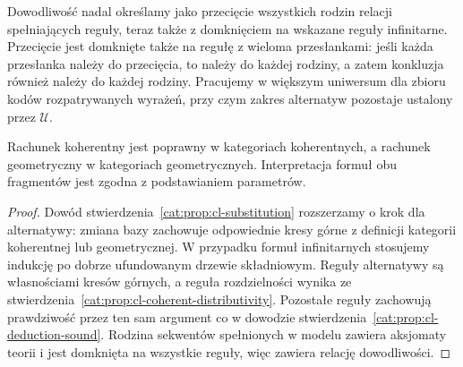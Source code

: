 Dowodliwość nadal określamy jako przecięcie wszystkich rodzin relacji spełniających reguły, teraz także z domknięciem na wskazane reguły infinitarne. Przecięcie jest domknięte także na regułę z wieloma przesłankami: jeśli każda przesłanka należy do przecięcia, to należy do każdej rodziny, a zatem konkluzja również należy do każdej rodziny. Pracujemy w większym uniwersum dla zbioru kodów rozpatrywanych wyrażeń, przy czym zakres alternatyw pozostaje ustalony przez $\mathcal U$.

\begin{twierdzenie}\label{cat:thm:cl-geometric-soundness}
Rachunek koherentny jest poprawny w kategoriach koherentnych, a rachunek geometryczny w kategoriach geometrycznych. Interpretacja formuł obu fragmentów jest zgodna z podstawianiem parametrów.
\end{twierdzenie}
\begin{proof}
Dowód stwierdzenia~\ref{cat:prop:cl-substitution} rozszerzamy o krok dla alternatywy: zmiana bazy zachowuje odpowiednie kresy górne z definicji kategorii koherentnej lub geometrycznej. W przypadku formuł infinitarnych stosujemy indukcję po dobrze ufundowanym drzewie składniowym. Reguły alternatywy są własnościami kresów górnych, a reguła rozdzielności wynika ze stwierdzenia~\ref{cat:prop:cl-coherent-distributivity}. Pozostałe reguły zachowują prawdziwość przez ten sam argument co w dowodzie stwierdzenia~\ref{cat:prop:cl-deduction-sound}. Rodzina sekwentów spełnionych w modelu zawiera aksjomaty teorii i jest domknięta na wszystkie reguły, więc zawiera relację dowodliwości.
\end{proof}

